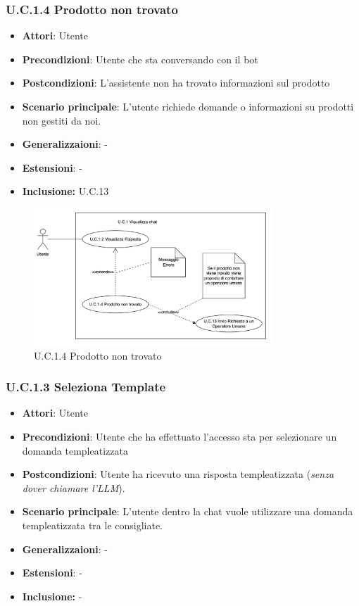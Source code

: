 \subsubsection{U.C.1.4 Prodotto non trovato}
\begin{itemize}
    \item \textbf{Attori}: Utente
    \item \textbf{Precondizioni}: Utente che sta conversando con il bot
    \item \textbf{Postcondizioni}: L'assistente non ha trovato informazioni sul prodotto
    \item \textbf{Scenario principale}: L’utente richiede domande o informazioni su prodotti non gestiti da noi.
    \item \textbf{Generalizzaioni}: -
    \item \textbf{Estensioni}: -
    \item \textbf{Inclusione:} U.C.13
\end{itemize}
\begin{figure}[h!]
    \centering
    \includegraphics[width=0.8\textwidth]{img/UC1-4.png}
    \caption{U.C.1.4 Prodotto non trovato}
\end{figure}
\subsubsection{U.C.1.3 Seleziona Template}
\begin{itemize}
    \item \textbf{Attori}: Utente
    \item \textbf{Precondizioni}: Utente che ha effettuato l’accesso sta per selezionare un domanda templeatizzata 
    \item \textbf{Postcondizioni}: Utente ha ricevuto una risposta templeatizzata (\textit{senza dover chiamare l’LLM}).
    \item \textbf{Scenario principale}: L’utente dentro la chat vuole utilizzare una domanda templeatizzata tra le consigliate.
    \item \textbf{Generalizzaioni}: -
    \item \textbf{Estensioni}: -
    \item \textbf{Inclusione:} -
\end{itemize}

